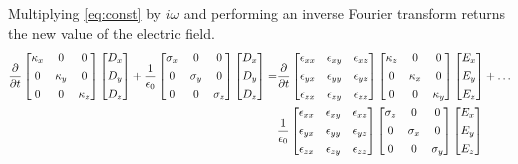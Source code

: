 \documentclass[]{article}
\begin{document}
		Multiplying \eqref{eq:const} by $i\omega$ and performing an inverse Fourier transform returns the new value of the electric field.
		\begin{align}
			\pdv{}{t}\begin{bmatrix}
				\kappa_{x} & 0 & 0 \\[4pt]
				0 & \kappa_{y} & 0 \\[4pt] 
				0 & 0 & \kappa_{z}
			\end{bmatrix}
			\begin{bmatrix}
				D_{x} \\[4pt]
				D_{y} \\[4pt]
				D_{z} 
			\end{bmatrix} + 
			\frac{1}{\epsilon_{0}}\begin{bmatrix}
				\sigma_{x} & 0 & 0 \\[4pt]
				0 & \sigma_{y} & 0 \\[4pt] 
				0 & 0 & \sigma_{z}
			\end{bmatrix}
			\begin{bmatrix}
			D_{x} \\[4pt]
			D_{y} \\[4pt]
			D_{z} 
			\end{bmatrix} = &
			\pdv{}{t}
			\begin{bmatrix}
				\epsilon_{xx} & \epsilon_{xy} & \epsilon_{xz} \\[4pt]
				\epsilon_{yx} & \epsilon_{yy} & \epsilon_{yz} \\[4pt] 
				\epsilon_{zx} & \epsilon_{zy} & \epsilon_{zz}
			\end{bmatrix}
			\begin{bmatrix}
				\kappa_{z} & 0 & 0 \\[4pt]
				0 & \kappa_{x} & 0 \\[4pt] 
				0 & 0 & \kappa_{y}
			\end{bmatrix}
			\begin{bmatrix}
				E_{x} \\[4pt]
				E_{y} \\[4pt]
				E_{z} 
			\end{bmatrix} + \dots \\ &
			\frac{1}{\epsilon_{0}}			\begin{bmatrix}
				\epsilon_{xx} & \epsilon_{xy} & \epsilon_{xz} \\[4pt]
				\epsilon_{yx} & \epsilon_{yy} & \epsilon_{yz} \\[4pt] 
				\epsilon_{zx} & \epsilon_{zy} & \epsilon_{zz}
			\end{bmatrix}\begin{bmatrix}
				\sigma_{z} & 0 & 0 \\[4pt]
				0 & \sigma_{x} & 0 \\[4pt] 
				0 & 0 & \sigma_{y}
			\end{bmatrix}
			\begin{bmatrix}
				E_{x} \\[4pt]
				E_{y} \\[4pt]
				E_{z} 
			\end{bmatrix}
		\end{align}
		
\end{document}
